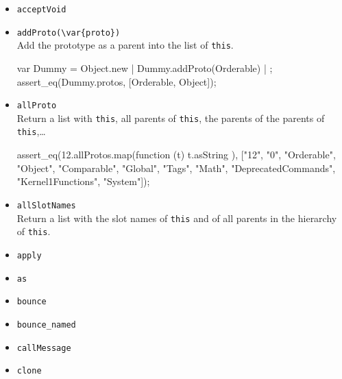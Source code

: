\begin{itemize}
\item \lstinline|acceptVoid|\\

\item \lstinline|addProto(\var{proto})|\\
  Add the prototype  as a parent into the list of
  \lstinline|this|.

\begin{urbiscript}
var Dummy = Object.new | Dummy.addProto(Orderable) | {};
assert_eq(Dummy.protos, [Orderable, Object]);
\end{urbiscript}

\item \lstinline|allProto|\\
  Return a list with \lstinline|this|, all parents of
  \lstinline|this|, the parents of the parents of
  \lstinline|this|,\ldots

\begin{urbiscript}[firstnumber=last]
assert_eq(12.allProtos.map(function (t) { t.asString }),
          ["12", "0", "Orderable", "Object", "Comparable", "Global",
           "Tags", "Math", "DeprecatedCommands", "Kernel1Functions",
           "System"]);
\end{urbiscript}

\item \lstinline|allSlotNames|\\
  Return a list with the slot names of \lstinline|this| and of all
  parents in the hierarchy of \lstinline|this|.

\item \lstinline|apply|\\

\item \lstinline|as|\\

\item \lstinline|bounce|\\

\item \lstinline|bounce_named|\\

\item \lstinline|callMessage|\\

\item \lstinline|clone|\\


\end{itemize}
